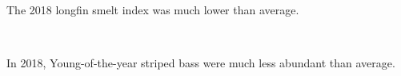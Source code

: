 \documentclass[
]{book}
\begin{document}
\begin{panel-grid}
\begin{columns-nocenter}
\begin{column800}
\end{column800}

\begin{column40}

~

\end{column40}

\begin{column800}

The 2018 longfin smelt index was much lower than average.

\end{column800}

\begin{column40}

~

\end{column40}

\begin{column800}

In 2018, Young-of-the-year striped bass were much less abundant than average.

\end{column800}

\end{columns-nocenter}

\end{panel-grid}
\end{document}
